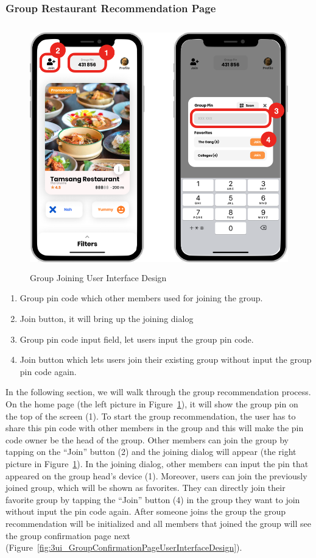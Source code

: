 \documentclass[12pt,oneside,openright,a4paper]{cpe-english-project}
\begin{document}
\newpage
\subsubsection{Group Restaurant Recommendation Page}
\begin{figure}[H]\centering
\includegraphics[height=300pt]{./images/3ui_GroupJoiningUserInterfaceDesign.png}
\caption{Group Joining User Interface Design}\label{fig:3ui_GroupJoiningUserInterfaceDesign}
\end{figure}\vspace{-24pt}

\begin{enumerate}
\item Group pin code which other members used for joining the group.
\item Join button, it will bring up the joining dialog
\item Group pin code input field, let users input the group pin code.
\item Join button which lets users join their existing group without input the group pin code again.
\end{enumerate}

In the following section, we will walk through the group recommendation process. On the home page (the left picture in Figure~\ref{fig:3ui_GroupJoiningUserInterfaceDesign}), it will show the group pin on the top of the screen (1). To start the group recommendation, the user has to share this pin code with other members in the group and this will make the pin code owner be the head of the group. Other members can join the group by tapping on the “Join” button (2) and the joining dialog will appear (the right picture in Figure~\ref{fig:3ui_GroupJoiningUserInterfaceDesign}). In the joining dialog, other members can input the pin that appeared on the group head’s device (1). Moreover, users can join the previously joined group, which will be shown as favorites. They can directly join their favorite group by tapping the “Join” button (4) in the group they want to join without input the pin code again. After someone joins the group the group recommendation will be initialized and all members that joined the group will see the group confirmation page next (Figure~\ref{fig:3ui_GroupConfirmationPageUserInterfaceDesign}).
\end{document}
